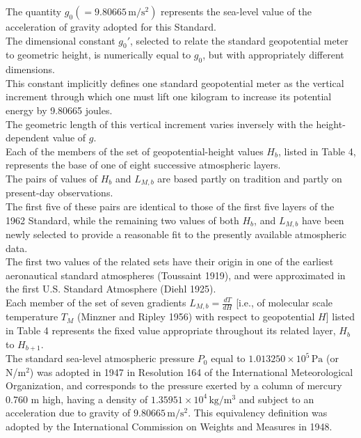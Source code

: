 \documentclass{article}
\begin{document}
The quantity $g_0 (= 9.80665 \, \mathrm{m/s^2})$ represents the sea-level value of the acceleration of gravity adopted for this Standard.\\

The dimensional constant $g_0'$, selected to relate the standard geopotential meter to geometric height, is numerically equal to $g_0$, but with appropriately different dimensions.\\
This constant implicitly defines one standard geopotential meter as the vertical increment through which one must lift one kilogram to increase its potential energy by 9.80665 joules.\\
The geometric length of this vertical increment varies inversely with the height-dependent value of $g$.\\

Each of the members of the set of geopotential-height values $H_b$, listed in Table 4, represents the base of one of eight successive atmospheric layers.\\
The pairs of values of $H_b$ and $L_{M,b}$ are based partly on tradition and partly on present-day observations.\\
The first five of these pairs are identical to those of the first five layers of the 1962 Standard, while the remaining two values of both $H_b$, and $L_{M,b}$ have been newly selected to provide a reasonable fit to the presently available atmospheric data.\\
The first two values of the related sets have their origin in one of the earliest aeronautical standard atmospheres (Toussaint 1919), and were approximated in the first U.S. Standard Atmosphere (Diehl 1925).\\

Each member of the set of seven gradients $L_{M,b} = \frac{dT}{dH}$ [i.e., of molecular scale temperature $T_M$ (Minzner and Ripley 1956) with respect to geopotential $H$] listed in Table 4 represents the fixed value appropriate throughout its related layer, $H_b$ to $H_{b+1}$.\\

The standard sea-level atmospheric pressure $P_0$ equal to $1.013250 \times 10^{5} \, \mathrm{Pa}$ (or N/m$^2$) was adopted in 1947 in Resolution 164 of the International Meteorological Organization, and corresponds to the pressure exerted by a column of mercury 0.760 m high, having a density of $1.35951 \times 10^{4} \, \mathrm{kg/m^3}$ and subject to an acceleration due to gravity of $9.80665 \, \mathrm{m/s^2}$.
This equivalency definition was adopted by the International Commission on Weights and Measures in 1948.\\
\end{document}
